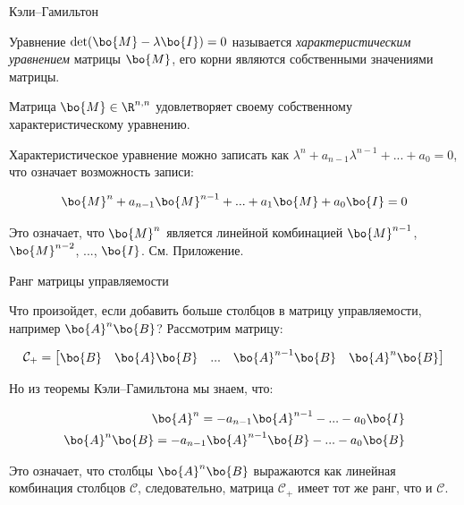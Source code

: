 \documentclass{beamer}
\begin{document}
\begin{frame}{Кэли–Гамильтон}
	\begin{flushleft}
		
		Уравнение $\text{det}(\bo{M} - \lambda\bo{I}) = 0$ называется \emph{характеристическим уравнением} матрицы $\bo{M}$, его корни являются собственными значениями матрицы.
		
		\bigskip
		
		\begin{theorem}
			Матрица $\bo{M} \in \R^{n, n}$ удовлетворяет своему собственному характеристическому уравнению.
		\end{theorem}
		
		Характеристическое уравнение можно записать как $\lambda^n + a_{n-1}\lambda^{n-1} + ... + a_0  = 0$, что означает возможность записи:
		
		\begin{equation}
			\bo{M}^n + a_{n-1}\bo{M}^{n-1} + ... + a_1\bo{M} + a_0\bo{I}  = 0
		\end{equation}	
		
		Это означает, что \textcolor{mydarkblue}{$\bo{M}^n$ является линейной комбинацией $\bo{M}^{n-1}$, $\bo{M}^{n-2}$, ..., $\bo{I}$}. См. Приложение.
		
	\end{flushleft}
\end{frame}



\begin{frame}{Ранг матрицы управляемости}
	\begin{flushleft}
		
		Что произойдет, если добавить больше столбцов в матрицу управляемости, например $\bo{A}^n \bo{B}$? Рассмотрим матрицу:
		
		\begin{equation}
			\mathcal{C}_+ = \begin{bmatrix}
				\bo{B} &
				\bo{A} \bo{B} & ... &
				\bo{A}^{n - 1} \bo{B} &
				\bo{A}^n \bo{B}
			\end{bmatrix}
		\end{equation}
		
		Но из теоремы Кэли–Гамильтона мы знаем, что: 
		
		\begin{align}
			\bo{A}^n = -a_{n-1}\bo{A}^{n-1} - ... - a_0\bo{I} 
			\\
			\bo{A}^n\bo{B} = -a_{n-1}\bo{A}^{n-1}\bo{B} - ... - a_0\bo{B}
		\end{align}
		
		Это означает, что столбцы $\bo{A}^n\bo{B}$ выражаются как линейная комбинация столбцов $\mathcal{C}$, следовательно, матрица $\mathcal{C}_+$ имеет тот же ранг, что и $\mathcal{C}$.
		
	\end{flushleft}
\end{frame}
\end{document}
